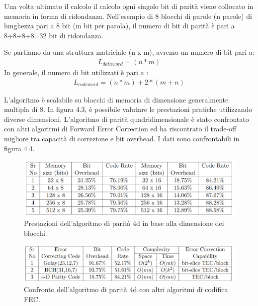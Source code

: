 \documentclass[LaM,binding=0.6cm,oneside]{../sapthesis}
\begin{document}
Una volta ultimato il calcolo il calcolo ogni singolo bit di parità viene collocato in memoria in forma di ridondanza. 
Nell’esempio di 8 blocchi di parole (n parole) di lunghezza pari a 8 bit (m bit per parola), il numero di bit di parità è pari a 8+8+8+8=32 bit di ridondanza.

Se partiamo da una struttura matriciale (n x m), avremo un numero di bit pari a:
\begin{align}
L_{dataword} = (n * m) 
\end{align}
In generale, il numero di bit utilizzati è pari a :
\begin{align}
L_{codeword} = (n * m) + 2 * (m+n)
\end{align}

L'algoritmo è scalabile su blocchi di memoria di dimensione generalmente multipla di 8. In figura 4.3, è possibile valutare le prestazioni pratiche utilizzando diverse dimensioni.
\newline
L'algoritmo di parità quadridimensionale è stato confrontato con altri algoritmi di Forward Error Correction ed ha riscontrato il trade-off migliore tra capacità di correzione e bit overhead. I dati sono confrontabili in figura 4.4.

\begin{figure}[htbp]
\centerline{\includegraphics[scale=0.48]{examples/4dPerformance1.PNG}}
\caption{Prestazioni dell'algoritmo di parità 4d in base alla dimensione dei blocchi.}
\label{fig}
\end{figure}
\newline

\begin{figure}[htbp]
\centerline{\includegraphics[scale=0.48]{examples/4dComparison.PNG}}
\caption{Confronto dell'algoritmo di parità 4d con altri algoritmi di codifica FEC.}
\label{fig}
\end{figure}
\newline
\end{document}
